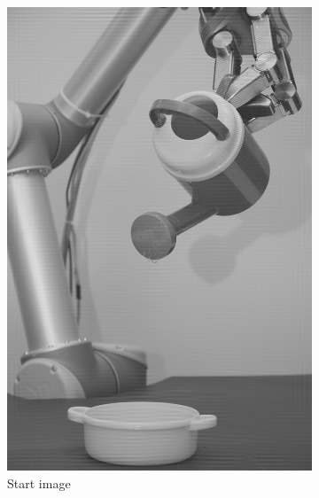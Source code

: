 \begin{figure}[H]
\centering
    \begin{subfigure}[b]{0.24\textwidth}
        \includegraphics[width=\textwidth]{img4/Image4_2.png}
        \caption{Start image}
        \label{fig:img2_hist}
    \end{subfigure}
	 \begin{subfigure}[b]{0.24\textwidth}

\end{subfigure}
\end{figure}
